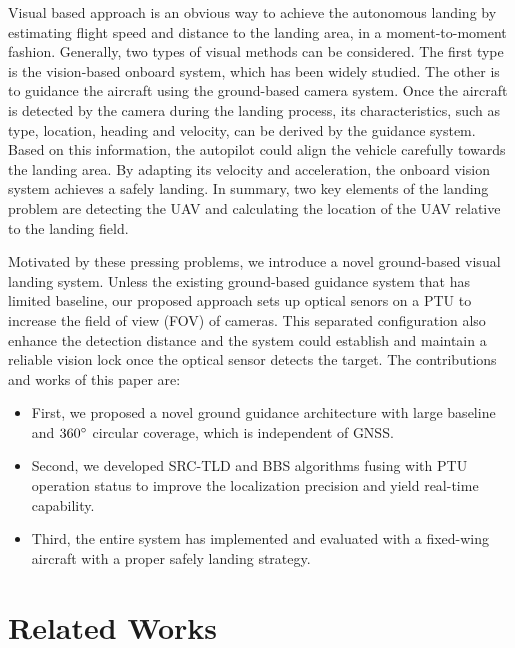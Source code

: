 Visual based approach is an obvious way to achieve the autonomous landing by estimating flight speed and distance to the landing area, in a moment-to-moment fashion. Generally, two types of visual methods can be considered. The first type is the vision-based onboard system, which has been widely studied. The other is to guidance the aircraft using the ground-based camera system. Once the aircraft is detected by the camera during the landing process, its characteristics, such as type, location, heading and velocity, can be derived by the guidance system. Based on this information, the autopilot could align the vehicle carefully towards the landing area. By adapting its velocity and acceleration, the onboard vision system achieves a safely landing. In summary, two key elements of the landing problem are detecting the UAV and calculating the location of the UAV relative to the landing field. 

Motivated by these pressing problems, we introduce a novel ground-based visual landing system. Unless the existing ground-based guidance system that has limited baseline, our proposed approach sets up optical senors on a PTU to increase the field of view (FOV) of cameras. This separated configuration also enhance the detection distance and the system could establish and maintain a reliable vision lock once the optical sensor detects the target. The contributions and works of this paper are:
\begin{itemize}
	\item First, we proposed a novel ground guidance architecture with large baseline and $360\degree$ circular coverage, which is independent of GNSS.
	\item Second, we developed SRC-TLD and BBS algorithms fusing with PTU operation status to improve the localization precision and yield real-time capability.
	\item Third, the entire system has implemented and evaluated with a fixed-wing aircraft with a proper safely landing strategy.
\end{itemize}

\section{Related Works}

